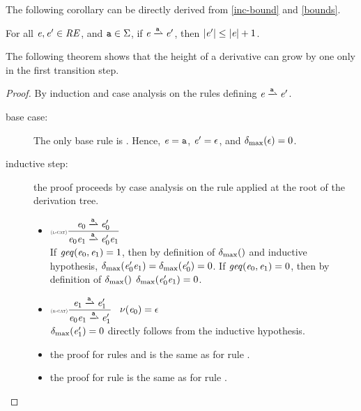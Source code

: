The following corollary can be directly derived from \cref{inc-bound} and \cref{bounds}.
\begin{corollary}
 For all $\mathit {e},\mathit {e}'\in\mathit {RE}$, and $\mathtt {a}\in\Sigma$, if $\re\parDer{\sym}\re'$, then ${\mid}{\mathit {e}'}{\mid}\leq{\mid}{\ensuremath{\mathit {e}}}{\mid}+1$.
\end{corollary}
The following theorem shows that the height of a derivative can grow by one only in the first transition step.
\begin{proof}
 By induction and case analysis on the rules defining $\re\parDer{\sym}\re'$.
 \begin{description}
  \item[base case:] The only base rule is .
   Hence, $\mathit {e}=\mathtt {a}$, $\mathit {e}'=\mathtt {\epsilon}$, and
   ${\delta_{\max}}({\mathtt {\epsilon}})=0$.
  \item[inductive step:] the proof proceeds by case analysis on the rule applied
   at the root of the derivation tree.
   \begin{itemize}
    \item $\Rule{l-cat}{\re_0\parDer{\sym}\re'_0}{\re_0\catop\re_1\parDer{\sym}\re'_0\catop\re_1}{}$\\[2ex]
          If $\mathit{geq}({\mathit {e}_0},{\mathit {e}_1})=1$, then by definition of ${\delta_{\max}}({})$ and inductive hypothesis, ${\delta_{\max}}({\mathit {e}'_0\mathit {e}_1})={\delta_{\max}}({\mathit {e}'_0})=0$.
          If $\mathit{geq}({\mathit {e}_0},{\mathit {e}_1})=0$, then by definition of ${\delta_{\max}}({})$ ${\delta_{\max}}({\mathit {e}'_0\mathit {e}_1})=0$.

    \item $\Rule{r-cat}{\re_1\parDer{\sym}\re'_1}{\re_0\catop\re_1\parDer{\sym}\re'_1}{\hasEps{\re_0}=\eps}$\\[2ex]
          ${\delta_{\max}}({\mathit {e}'_1})=0$ directly follows from the inductive hypothesis.

    \item the proof for rules  and  is the same as for rule .

    \item the proof for rule  is the same as for rule .
   \end{itemize}
 \end{description}
\end{proof}

